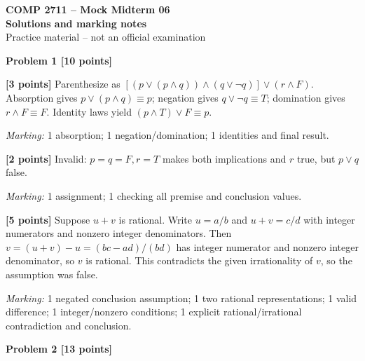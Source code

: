 \documentclass[12pt,letterpaper]{article}
\newcommand{\problemheading}[2][5\baselineskip]{\Needspace{#1}\par\noindent\hspace*{-0.625in}\textbf{#2}\par\nobreak\vspace{0.3em}}
\begin{document}
\begin{center}\textbf{COMP 2711 -- Mock Midterm 06}\\{\large\bfseries Solutions and marking notes}\\Practice material -- not an official examination\end{center}\vspace{0.5em}
\problemheading[\dimexpr 3\baselineskip+4\baselineskip\relax]{Problem 1 [10 points]}
\begin{description}[font=\normalfont,leftmargin=1.2em,labelsep=0.4em]
\item[(a)] \textbf{[3 points]} Parenthesize as $[(p\lor(p\land q))\land(q\lor\neg q)]\lor(r\land F)$. Absorption gives $p\lor(p\land q)\equiv p$; negation gives $q\lor\neg q\equiv T$; domination gives $r\land F\equiv F$. Identity laws yield $(p\land T)\lor F\equiv\boxed p$.
\par\textit{Marking:} 1 absorption; 1 negation/domination; 1 identities and final result.
\item[(b)] \textbf{[2 points]} Invalid: $p=q=F,r=T$ makes both implications and $r$ true, but $p\lor q$ false.
\par\textit{Marking:} 1 assignment; 1 checking all premise and conclusion values.
\item[(c)] \textbf{[5 points]} Suppose $u+v$ is rational. Write $u=a/b$ and $u+v=c/d$ with integer numerators and nonzero integer denominators. Then $v=(u+v)-u=(bc-ad)/(bd)$ has integer numerator and nonzero integer denominator, so $v$ is rational. This contradicts the given irrationality of $v$, so the assumption was false.
\par\textit{Marking:} 1 negated conclusion assumption; 1 two rational representations; 1 valid difference; 1 integer/nonzero conditions; 1 explicit rational/irrational contradiction and conclusion.
\end{description}
\vspace{0.65em}
\problemheading[\dimexpr 3\baselineskip+4\baselineskip\relax]{Problem 2 [13 points]}
\end{document}

